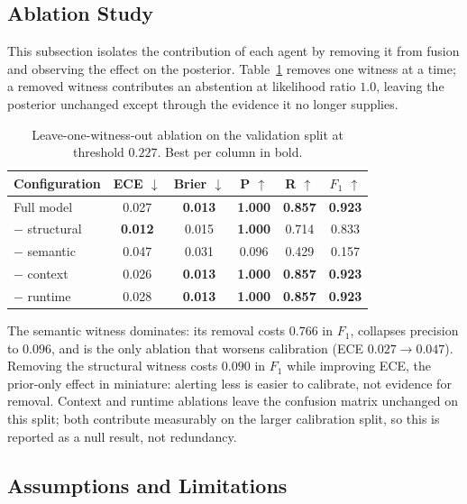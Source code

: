 \documentclass[conference]{IEEEtran}
\begin{document}
\subsection{Ablation Study}
\label{subsec:ablation}

This subsection isolates the contribution of each agent by removing it from
fusion and observing the effect on the posterior. Table~\ref{tab:ablation}
removes one witness at a time; a removed witness contributes an abstention
at likelihood ratio $1.0$, leaving the posterior unchanged except through
the evidence it no longer supplies.
\newline

\begin{table}[t]
\centering
\caption{Leave-one-witness-out ablation on the validation split at
threshold $0.227$. Best per column in bold.}
\label{tab:ablation}
\small
\setlength{\tabcolsep}{4pt}
\begin{tabular}{lccccc}
\toprule
Configuration & ECE $\downarrow$ & Brier $\downarrow$ & P $\uparrow$ & R $\uparrow$ & $F_1$ $\uparrow$ \\
\midrule
Full model     & 0.027 & \textbf{0.013} & \textbf{1.000} & \textbf{0.857} & \textbf{0.923} \\
\midrule
$-$ structural & \textbf{0.012} & 0.015 & \textbf{1.000} & 0.714 & 0.833 \\
$-$ semantic   & 0.047 & 0.031 & 0.096 & 0.429 & 0.157 \\
$-$ context    & 0.026 & \textbf{0.013} & \textbf{1.000} & \textbf{0.857} & \textbf{0.923} \\
$-$ runtime    & 0.028 & \textbf{0.013} & \textbf{1.000} & \textbf{0.857} & \textbf{0.923} \\
\bottomrule
\end{tabular}
\end{table}

The semantic witness dominates: its removal costs $0.766$ in $F_1$,
collapses precision to $0.096$, and is the only ablation that worsens
calibration (ECE $0.027 \rightarrow 0.047$). Removing the structural
witness costs $0.090$ in $F_1$ while improving ECE, the prior-only effect
in miniature: alerting less is easier to calibrate, not evidence for
removal. Context and runtime ablations leave the confusion matrix
unchanged on this split; both contribute measurably on the larger
calibration split, so this is reported as a null result, not redundancy.

\subsection{Assumptions and Limitations}
\label{subsec:limitations}
\end{document}
